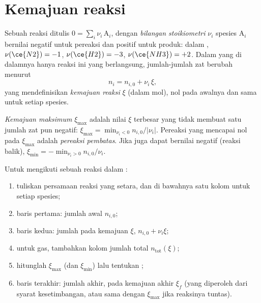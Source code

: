 \section{Kemajuan reaksi}

\begin{definition}\label{def:b1:extent-q-and-k:extent}
Sebuah reaksi ditulis $0 = \sum_i \nu_i\,\mathrm{A}_i$, dengan
\emph{bilangan stoikiometri} $\nu_i$ spesies
$\mathrm{A}_i$ bernilai negatif untuk pereaksi dan positif untuk produk:
dalam , $\nu(\ce{N2}) = -1$, $\nu(\ce{H2}) = -3$,
$\nu(\ce{NH3}) = +2$. Dalam  yang di dalamnya hanya reaksi
ini yang berlangsung, jumlah-jumlah zat berubah menurut
\[
  n_i = n_{i,0} + \nu_i\,\xi ,
\]
yang mendefinisikan \emph{kemajuan reaksi}
$\xi$ (dalam mol), nol pada awalnya dan sama untuk setiap spesies.
\end{definition}

\begin{definition}\label{def:b1:extent-q-and-k:max-extent}
\emph{Kemajuan maksimum} $\xi_{\max}$ adalah
nilai $\xi$ terbesar yang tidak membuat satu jumlah zat pun negatif: $\xi_{\max} = \min_{\nu_i <
0} n_{i,0}/|\nu_i|$. Pereaksi yang mencapai nol pada $\xi_{\max}$ adalah
\emph{pereaksi pembatas}. Jika 
juga dapat bernilai negatif (reaksi balik), $\xi_{\min} = -\min_{\nu_i > 0}
n_{i,0}/\nu_i$.
\end{definition}

\begin{method}\label{met:b1:extent-q-and-k:progress-table}
Untuk mengikuti sebuah reaksi dalam :
\begin{enumerate}
  \item tuliskan persamaan reaksi yang setara, dan di bawahnya satu kolom
        untuk setiap spesies;
  \item baris pertama: jumlah awal $n_{i,0}$;
  \item baris kedua: jumlah pada kemajuan $\xi$, $n_{i,0} + \nu_i\xi$;
  \item untuk gas, tambahkan kolom jumlah total $n_{\text{tot}}(\xi)$;
  \item hitunglah $\xi_{\max}$ (dan $\xi_{\min}$) lalu tentukan ;
  \item baris terakhir: jumlah akhir, pada kemajuan akhir $\xi_f$ (yang
        diperoleh dari syarat kesetimbangan, atau sama dengan $\xi_{\max}$
        jika reaksinya tuntas).
\end{enumerate}
\end{method}

